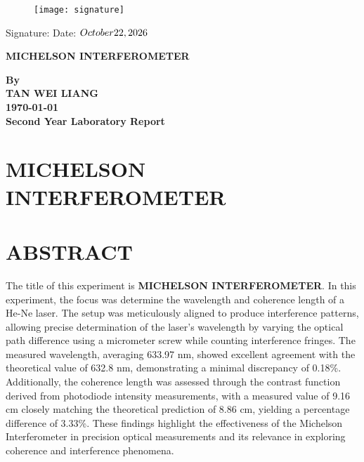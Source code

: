 \documentclass[a4paper,11pt]{article}
\begin{document}
\bigskip
\begin{figure}[htbp]
\hspace{35mm}
\texttt{[image: signature]}
\label{6}
\vspace{-12mm}
\end{figure}
\noindent Signature: \hrulefill \hfill Date: \uline{$\today$}

\newpage

\thispagestyle{empty}


\begin{center}
\vspace*{1cm}
\textbf{\Large MICHELSON INTERFEROMETER}

\vspace{3.0cm}
\textbf{\Large By}\\

\vspace{3.0cm}
\textbf{\Large TAN WEI LIANG} \\

\vspace{6.0cm}
\textbf{\Large \today}\\

\vfill
\textbf{\Large Second Year Laboratory Report}
\end{center}
\newpage

\section*{\Large \center MICHELSON INTERFEROMETER}
\section*{\large \center ABSTRACT}
\label{sec:ABSTRACT}

\qquad The title of this experiment is \textbf{MICHELSON INTERFEROMETER}. In this experiment, the focus was determine the wavelength and coherence length of a He-Ne laser. The setup was meticulously aligned to produce interference patterns, allowing precise determination of the laser's wavelength by varying the optical path difference using a micrometer screw while counting interference fringes. The measured wavelength, averaging 633.97 nm, showed excellent agreement with the theoretical value of 632.8 nm, demonstrating a minimal discrepancy of 0.18\%. Additionally, the coherence length was assessed through the contrast function derived from photodiode intensity measurements, with a measured value of 9.16 cm closely matching the theoretical prediction of 8.86 cm, yielding a percentage difference of 3.33\%. These findings highlight the effectiveness of the Michelson Interferometer in precision optical measurements and its relevance in exploring coherence and interference phenomena.
\end{document}
